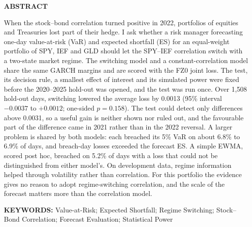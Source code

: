 \begin{center}\textbf{ABSTRACT}\end{center}
When the stock--bond correlation turned positive in 2022, portfolios of equities and Treasuries lost part of their hedge. I ask whether a risk manager forecasting one-day value-at-risk (VaR) and expected shortfall (ES) for an equal-weight portfolio of SPY, IEF and GLD should let the SPY--IEF correlation switch with a two-state market regime. The switching model and a constant-correlation model share the same GARCH margins and are scored with the FZ0 joint loss. The test, its decision rule, a smallest effect of interest and its simulated power were fixed before the 2020--2025 hold-out was opened, and the test was run once. Over 1,508 hold-out days, switching lowered the average loss by 0.0013 (95\% interval $-0.0037$ to $+0.0012$; one-sided $p=0.158$). The test could detect only differences above 0.0031, so a useful gain is neither shown nor ruled out, and the favourable part of the difference came in 2021 rather than in the 2022 reversal. A larger problem is shared by both models: each breached its 5\% VaR on about 6.8\% to 6.9\% of days, and breach-day losses exceeded the forecast ES. A simple EWMA, scored post hoc, breached on 5.2\% of days with a loss that could not be distinguished from either model's. On development data, regime information helped through volatility rather than correlation. For this portfolio the evidence gives no reason to adopt regime-switching correlation, and the scale of the forecast matters more than the correlation model.

\vfill
\noindent\textbf{KEYWORDS:} Value-at-Risk; Expected Shortfall; Regime Switching; Stock--Bond Correlation; Forecast Evaluation; Statistical Power
